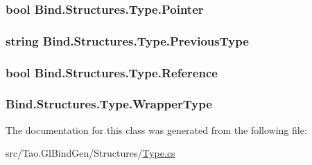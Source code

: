 \hypertarget{class_bind_1_1_structures_1_1_type_ac600f3673145b81982f0f75b6e2f4e2e}{
\subsubsection[{Pointer}]{\setlength{\rightskip}{0pt plus 5cm}bool Bind.Structures.Type.Pointer}}
\label{class_bind_1_1_structures_1_1_type_ac600f3673145b81982f0f75b6e2f4e2e}
\hypertarget{class_bind_1_1_structures_1_1_type_a8a6b3be164b6158f5c311d8773090e04}{
\subsubsection[{PreviousType}]{\setlength{\rightskip}{0pt plus 5cm}string Bind.Structures.Type.PreviousType}}
\label{class_bind_1_1_structures_1_1_type_a8a6b3be164b6158f5c311d8773090e04}
\hypertarget{class_bind_1_1_structures_1_1_type_a3f865bbf68cda2cc1fe04a839199fae5}{
\subsubsection[{Reference}]{\setlength{\rightskip}{0pt plus 5cm}bool Bind.Structures.Type.Reference}}
\label{class_bind_1_1_structures_1_1_type_a3f865bbf68cda2cc1fe04a839199fae5}
\hypertarget{class_bind_1_1_structures_1_1_type_aa4fd10332910b07134294165107a741e}{
\subsubsection[{WrapperType}]{ Bind.Structures.Type.WrapperType}}
\label{class_bind_1_1_structures_1_1_type_aa4fd10332910b07134294165107a741e}


The documentation for this class was generated from the following file:\begin{DoxyCompactItemize}
\item 
src/Tao.GlBindGen/Structures/\hyperlink{_type_8cs}{Type.cs}\end{DoxyCompactItemize}
